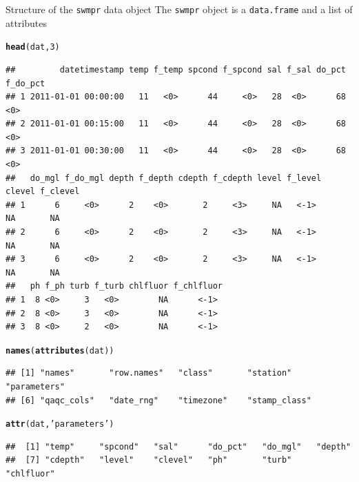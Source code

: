 \documentclass[xcolor=dvipsnames,serif]{beamer}\usepackage[]{graphicx}\usepackage[]{color}
\makeatletter
\newcommand{\hlnum}[1]{\textcolor[rgb]{0.686,0.059,0.569}{#1}}%
\newcommand{\hlstr}[1]{\textcolor[rgb]{0.192,0.494,0.8}{#1}}%
\newcommand{\hlstd}[1]{\textcolor[rgb]{0.345,0.345,0.345}{#1}}%
\newcommand{\hlkwd}[1]{\textcolor[rgb]{0.737,0.353,0.396}{\textbf{#1}}}%
\newenvironment{kframe}{%
 \def\at@end@of@kframe{}%
 \ifinner\ifhmode%
  \def\at@end@of@kframe{\end{minipage}}%
  \begin{minipage}{\columnwidth}%
 \fi\fi%
 \def\FrameCommand##1{\hskip\@totalleftmargin \hskip-\fboxsep
 \colorbox{shadecolor}{##1}\hskip-\fboxsep
     \hskip-\linewidth \hskip-\@totalleftmargin \hskip\columnwidth}%
 \MakeFramed {\advance\hsize-\width
   \@totalleftmargin\z@ \linewidth\hsize
   \@setminipage}}%
 {\par\unskip\endMakeFramed%
 \at@end@of@kframe}
\newenvironment{knitrout}{}{} %
\makeatother
\begin{document}
\begin{frame}{Structure of the \texttt{swmpr} data object}
The \texttt{swmpr} object is a \texttt{data.frame} and a list of attributes 
\begin{knitrout}\scriptsize
{}\color{fgcolor}\begin{kframe}
\begin{alltt}
\hlkwd{head}\hlstd{(dat,} \hlnum{3}\hlstd{)}
\end{alltt}
\begin{verbatim}
##         datetimestamp temp f_temp spcond f_spcond sal f_sal do_pct f_do_pct
## 1 2011-01-01 00:00:00   11   <0>      44     <0>   28  <0>      68     <0> 
## 2 2011-01-01 00:15:00   11   <0>      44     <0>   28  <0>      68     <0> 
## 3 2011-01-01 00:30:00   11   <0>      44     <0>   28  <0>      68     <0> 
##   do_mgl f_do_mgl depth f_depth cdepth f_cdepth level f_level clevel f_clevel
## 1      6     <0>      2    <0>       2     <3>     NA   <-1>      NA       NA
## 2      6     <0>      2    <0>       2     <3>     NA   <-1>      NA       NA
## 3      6     <0>      2    <0>       2     <3>     NA   <-1>      NA       NA
##   ph f_ph turb f_turb chlfluor f_chlfluor
## 1  8 <0>     3   <0>        NA      <-1> 
## 2  8 <0>     3   <0>        NA      <-1> 
## 3  8 <0>     2   <0>        NA      <-1>
\end{verbatim}
\begin{alltt}
\hlkwd{names}\hlstd{(}\hlkwd{attributes}\hlstd{(dat))}
\end{alltt}
\begin{verbatim}
## [1] "names"       "row.names"   "class"       "station"     "parameters" 
## [6] "qaqc_cols"   "date_rng"    "timezone"    "stamp_class"
\end{verbatim}
\begin{alltt}
\hlkwd{attr}\hlstd{(dat,} \hlstr{'parameters'}\hlstd{)}
\end{alltt}
\begin{verbatim}
##  [1] "temp"     "spcond"   "sal"      "do_pct"   "do_mgl"   "depth"   
##  [7] "cdepth"   "level"    "clevel"   "ph"       "turb"     "chlfluor"
\end{verbatim}
\end{kframe}
\end{knitrout}
\end{frame}
\end{document}
